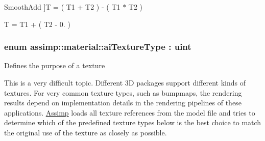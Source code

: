 \begin{Desc}
\begin{description}
{\hypertarget{namespaceassimp_1_1material_ab30a105144c2d883a472a0da51309df3aa7b5c981daac442917e0cf8ac8986bc8}{Smooth\+Add}\label{namespaceassimp_1_1material_ab30a105144c2d883a472a0da51309df3aa7b5c981daac442917e0cf8ac8986bc8}
}]{\ttfamily T = ( T1 + T2 ) -\/ ( T1 $\ast$ T2 )} \item[{\em 
\hypertarget{namespaceassimp_1_1material_ab30a105144c2d883a472a0da51309df3a37683f00c832e15ae7aefd72051295ac}{Signed\+Add}\label{namespaceassimp_1_1material_ab30a105144c2d883a472a0da51309df3a37683f00c832e15ae7aefd72051295ac}
}]{\ttfamily T = T1 + ( T2 -\/ 0. )} \end{description}
\end{Desc}
\hypertarget{namespaceassimp_1_1material_a034b83e48ea4f51696e276d3d5403f1b}{
\subsubsection[{ai\+Texture\+Type}]{\setlength{\rightskip}{0pt plus 5cm}enum {\bf assimp\+::material\+::ai\+Texture\+Type} \+: uint}}\label{namespaceassimp_1_1material_a034b83e48ea4f51696e276d3d5403f1b}
Defines the purpose of a texture

This is a very difficult topic. Different 3\+D packages support different kinds of textures. For very common texture types, such as bumpmaps, the rendering results depend on implementation details in the rendering pipelines of these applications. \hyperlink{class_assimp}{Assimp} loads all texture references from the model file and tries to determine which of the predefined texture types below is the best choice to match the original use of the texture as closely as possible.

